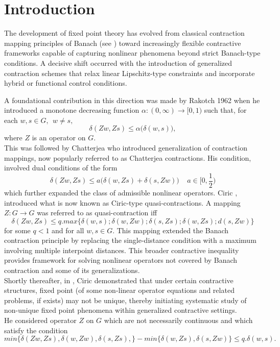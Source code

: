 \documentclass[11pt,reqno]{amsart}
\theoremstyle{definition}
\theoremstyle{remark}
\numberwithin{equation}{section}
\begin{document}
	\section{Introduction}
	The development of fixed point theory has evolved from classical contraction mapping principles  of Banach (see \cite{Banach1922}) toward increasingly flexible contractive frameworks capable of capturing nonlinear phenomena beyond strict Banach-type conditions. A decisive shift occurred with the introduction of generalized contraction schemes that relax linear Lipschitz-type constraints and incorporate hybrid or functional control conditions.
	
	A foundational contribution in this direction was made by Rakotch 1962 \cite{Rakotch1962} when he introduced a monotone decreasing function $\alpha: (0, \infty) \to [0,1)$ such that, for each $w,s \in G, ~~w \neq s,$ 
	\begin{equation}
		\delta(Zw,Zs) \leq \alpha \Big( \delta(w,s) \Big),
	\end{equation}
	where $Z$ is an operator on $G.$\\
	This was followed by  Chatterjea \cite{Chatterjea1972} who introduced generalization of contraction mappings, now popularly referred to as Chatterjea contractions. His condition, involved dual conditions of the form
	\begin{equation}
		\delta(Zw,Zs) \leq a\Big( \delta(w,Zs)+\delta(s,Zw)\Big)~~~~~a \in [0,\frac{1}{2})
	\end{equation}
	which further expanded the class of admissible nonlinear operators.  Ciric \cite{Ciric1974a}, introduced what is now known as Ciric-type quasi-contractions. A mapping $Z: G \to G$ was referred to as quasi-contraction iff 
	\begin{equation}\label{eqn1.3}
		\delta(Zw, Zs)\leq q. max\{\delta(w, s); \delta(w, Zw); \delta(s, Zs); \delta(w, Zs); d(s, Zw)\}
	\end{equation}
	for some $q < 1$ and for all $w,s \in G.$
	This mapping extended the Banach contraction principle by replacing the single-distance condition with a maximum involving multiple interpoint distances. This broader contractive inequality provides framework for solving nonlinear operators not covered by Banach contraction and some of its generalizations.\\
	Shortly thereafter, in \cite{Ciric1974}, Ciric demonstrated that under certain contractive structures, fixed point (of some non-linear operator equations and related problems, if exists) may not be unique, thereby initiating systematic study of non-unique fixed point phenomena within generalized contractive settings.\\
	He considered operator $Z$ on $G$ which are not necessarily continuous and which satisfy the condition
	\begin{equation}
		min\{\delta(Zw,Zs), \delta(w,Zw), \delta(s,Zs),\}-min\{\delta(w,Zs), \delta(s,Zw)\} \leq q.\delta(w,s).
	\end{equation}
	
\end{document}

